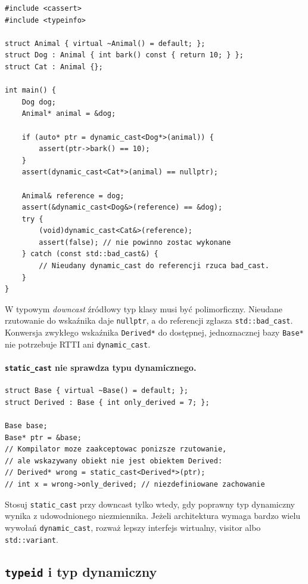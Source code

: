 \begin{lstlisting}[caption={Sprawdzona konwersja w dół hierarchii (C++11); kompletny program.}]
#include <cassert>
#include <typeinfo>

struct Animal { virtual ~Animal() = default; };
struct Dog : Animal { int bark() const { return 10; } };
struct Cat : Animal {};

int main() {
    Dog dog;
    Animal* animal = &dog;

    if (auto* ptr = dynamic_cast<Dog*>(animal)) {
        assert(ptr->bark() == 10);
    }
    assert(dynamic_cast<Cat*>(animal) == nullptr);

    Animal& reference = dog;
    assert(&dynamic_cast<Dog&>(reference) == &dog);
    try {
        (void)dynamic_cast<Cat&>(reference);
        assert(false); // nie powinno zostac wykonane
    } catch (const std::bad_cast&) {
        // Nieudany dynamic_cast do referencji rzuca bad_cast.
    }
}
\end{lstlisting}

W typowym \emph{downcast} źródłowy typ klasy musi być polimorficzny.
Nieudane rzutowanie do wskaźnika daje \texttt{nullptr}, a do referencji
zgłasza \texttt{std::bad\_cast}. Konwersja zwykłego wskaźnika
\texttt{Derived*} do dostępnej, jednoznacznej bazy \texttt{Base*}
nie potrzebuje RTTI ani \texttt{dynamic\_cast}.

\paragraph{\texttt{static\_cast} nie sprawdza typu dynamicznego.}

\begin{lstlisting}[caption={Niebezpieczny downcast; fragment celowo błędny.}]
struct Base { virtual ~Base() = default; };
struct Derived : Base { int only_derived = 7; };

Base base;
Base* ptr = &base;
// Kompilator moze zaakceptowac ponizsze rzutowanie,
// ale wskazywany obiekt nie jest obiektem Derived:
// Derived* wrong = static_cast<Derived*>(ptr);
// int x = wrong->only_derived; // niezdefiniowane zachowanie
\end{lstlisting}

\noindent Stosuj \texttt{static\_cast} przy downcast tylko wtedy,
gdy poprawny typ dynamiczny wynika z udowodnionego niezmiennika.
Jeżeli architektura wymaga bardzo wielu wywołań \texttt{dynamic\_cast},
rozważ lepszy interfejs wirtualny, visitor albo \texttt{std::variant}.

\subsection{\texttt{typeid} i typ dynamiczny}

